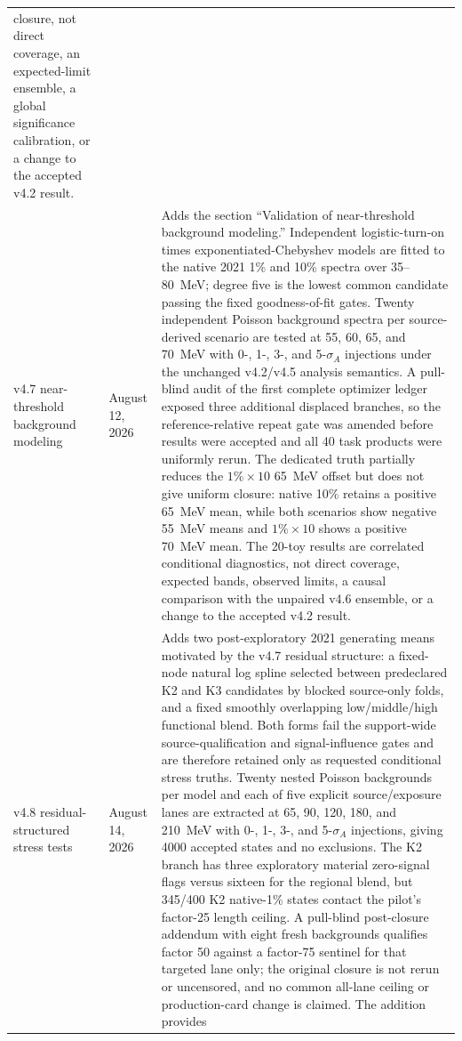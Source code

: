 \begin{longtable}{P{0.11\textwidth}P{0.16\textwidth}P{0.64\textwidth}}
closure, not direct \CLs{} coverage, an expected-limit ensemble, a global
significance calibration, or a change to the accepted v4.2 result. \\
\addlinespace
v4.7 near-threshold background modeling & August 12, 2026 &
Adds the section ``Validation of near-threshold background modeling.''
Independent logistic-turn-on times exponentiated-Chebyshev models are fitted
to the native 2021 1\% and 10\% spectra over 35--80~MeV; degree five is the
lowest common candidate passing the fixed goodness-of-fit gates.  Twenty
independent Poisson background spectra per source-derived scenario are tested
at 55, 60, 65, and 70~MeV with 0-, 1-, 3-, and 5-$\sigma_A$ injections under
the unchanged v4.2/v4.5 analysis semantics.  A pull-blind audit of the first
complete optimizer ledger exposed three additional displaced branches, so
the reference-relative repeat gate was amended before results were accepted
and all 40 task products were uniformly rerun.  The dedicated truth partially
reduces the $1\%\times10$ 65~MeV offset but does not give uniform closure:
native 10\% retains a positive 65~MeV mean, while both scenarios show negative
55~MeV means and $1\%\times10$ shows a positive 70~MeV mean.  The 20-toy
results are correlated conditional diagnostics, not direct coverage, expected
bands, observed limits, a causal comparison with the unpaired v4.6 ensemble,
or a change to the accepted v4.2 result. \\
\addlinespace
v4.8 residual-structured stress tests & August 14, 2026 &
Adds two post-exploratory 2021 generating means motivated by the v4.7 residual
structure: a fixed-node natural log spline selected between predeclared K2 and
K3 candidates by blocked source-only folds, and a fixed smoothly overlapping
low/middle/high functional blend.  Both forms fail the support-wide
source-qualification and signal-influence gates and are therefore retained
only as requested conditional stress truths.  Twenty nested Poisson
backgrounds per model and each of five explicit source/exposure lanes are
extracted at 65, 90, 120, 180, and 210~MeV with 0-, 1-, 3-, and
5-$\sigma_A$ injections, giving 4000 accepted states and no exclusions.  The
K2 branch has three exploratory material zero-signal flags versus sixteen for
the regional blend, but 345/400 K2 native-1\% states contact the pilot's
factor-25 length ceiling.  A pull-blind post-closure addendum with eight fresh
backgrounds qualifies factor 50 against a factor-75 sentinel for that targeted
lane only; the original closure is not rerun or uncensored, and no common
all-lane ceiling or production-card change is claimed.  The addition provides

\end{longtable}
